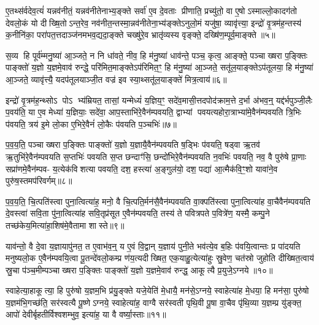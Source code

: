 ए॒तथ्स॑र्वदेव॒त्यं॑ यन्नव॑नीतं॒ यन्नव॑नीतेनाभ्य॒ङ्क्ते सर्वा॑ ए॒व दे॒वताः प्रीणाति॒ प्रच्यु॑तो॒ वा ए॒षोऽस्माल्लो॒कादग॑तो देवलो॒कं यो दीख्षि॒तोऽन्त॒रेव॒ नव॑नीत॒न्तस्मा॒न्नव॑नीतेना॒भ्य॑ङ्क्तेऽनुलो॒मं यजु॑षा॒ व्यावृ॑त्त्या॒ इन्द्रो॑ वृ॒त्रम॑ह॒न्तस्य॑ क॒नीनि॑का॒ परा॑पत॒त्तदाञ्ज॑नमभव॒द्यदा॒ङ्क्ते चख्षु॑रे॒व भ्रातृ॑व्यस्य वृङ्क्ते॒ दख्षि॑ण॒म्पूर्व॒माङ्क्ते॥५॥

स॒व्य हि पूर्व॑म्मनु॒ष्या॑ आ॒ञ्जते॒ न नि धा॑वते॒ नीव॒ हि म॑नु॒ष्या॑ धाव॑न्ते॒ पञ्च॒ कृत्व॒ आङ्क्ते॒ पञ्चाख्षरा प॒ङ्क्तिः पाङ्क्तो॑ य॒ज्ञो य॒ज्ञमे॒वाव॑ रुन्द्धे॒ परि॑मित॒माङ्क्तेऽप॑रिमित॒ꣳ॒ हि म॑नु॒ष्या॑ आ॒ञ्जते॒ सतू॑ल॒याङ्क्तेऽप॑तूलया॒ हि म॑नु॒ष्या॑ आ॒ञ्जते॒ व्यावृ॑त्त्यै॒ यदप॑तूलयाञ्जी॒त वज्र॑ इव स्या॒थ्सतू॑ल॒याङ्क्ते॑ मित्र॒त्वाय॑॥६॥

इन्द्रो॑ वृ॒त्रम॑ह॒न्थ्सोऽ पोऽ भ्य॑म्रियत॒ तासां॒ यन्मेध्यं॑ य॒ज्ञिय॒ꣳ॒ सदे॑व॒मासी॒त्तदपोद॑क्राम॒त्ते द॒र्भा अ॑भव॒न्॒ यद्द॑र्भपुञ्जी॒लैः प॒वय॑ति॒ या ए॒व मेध्या॑ य॒ज्ञियाः॒ सदे॑वा॒ आप॒स्ताभि॑रे॒वैन॑म्पवयति॒ द्वाभ्यां पवयत्यहोरा॒त्राभ्या॑मे॒वैन॑म्पवयति त्रि॒भिः प॑वयति॒ त्रय॑ इ॒मे लो॒का ए॒भिरे॒वैनं॑ लो॒कैः प॑वयति प॒ञ्चभिः॑॥७॥

प॒व॒य॒ति॒ पञ्चाख्षरा प॒ङ्क्तिः पाङ्क्तो॑ य॒ज्ञो य॒ज्ञायै॒वैन॑म्पवयति ष॒ड्भिः प॑वयति॒ षड्वा ऋ॒तव॑ ऋ॒तुभि॑रे॒वैन॑म्पवयति स॒प्तभिः॑ पवयति स॒प्त छन्दाꣳ॑सि॒ छन्दो॑भिरे॒वैन॑म्पवयति न॒वभिः॑ पवयति॒ नव॒ वै पुरु॑षे प्रा॒णाः सप्रा॑णमे॒वैन॑म्पव- य॒त्येक॑विशत्या पवयति॒ दश॒ हस्त्या॑ अ॒ङ्गुल॑यो॒ दश॒ पद्या॑ आ॒त्मैक॑वि॒ꣳ॒शो यावा॑ने॒व पुरु॑ष॒स्तमप॑रिवर्गम्॥८॥

प॒व॒य॒ति॒ चि॒त्पति॑स्त्वा पुना॒त्वित्या॑ह॒ मनो॒ वै चि॒त्पति॒र्मन॑सै॒वैन॑म्पवयति वा॒क्पति॑स्त्वा पुना॒त्वित्या॑ह वा॒चैवैन॑म्पवयति दे॒वस्त्वा॑ सवि॒ता पु॑ना॒त्वित्या॑ह सवि॒तृप्र॑सूत ए॒वैन॑म्पवयति॒ तस्य॑ ते पवित्रपते प॒वित्रे॑ण॒ यस्मै॒ कम्पु॒ने तच्छ॑केय॒मित्या॑हा॒शिष॑मे॒वैतामा शास्ते॥९॥

{\anuvakamend[{अ॒ती॒का॒शान्क॑रो॒त्यवे॑शयन्ती॒र्थे स्ना॑ति प्रघा॒तो म॑नु॒ष्या॑णा॒न्तद्वा आङ्क्ते॑ मित्र॒त्वाय॑ प॒ञ्चभि॒रप॑रिवर्गम॒ष्टाच॑त्वारिशच्च॥१॥}]}

याव॑न्तो॒ वै दे॒वा य॒ज्ञायापु॑नत॒ त ए॒वाभ॑व॒न्॒ य ए॒वं वि॒द्वान् य॒ज्ञाय॑ पुनी॒ते भव॑त्ये॒व ब॒हिः प॑वयि॒त्वान्तः प्र पा॑दयति मनुष्यलो॒क ए॒वैन॑म्पवयि॒त्वा पू॒तन्दे॑वलो॒कम्प्र ण॑य॒त्यदीख्षित॒ एक॒याहु॒त्येत्या॑हुः स्रु॒वेण॒ चत॑स्रो जुहोति दीख्षित॒त्वाय॑ स्रु॒चा प॑ञ्च॒मीम्पञ्चाख्षरा प॒ङ्क्तिः पाङ्क्तो॑ य॒ज्ञो य॒ज्ञमे॒वाव॑ रुन्द्ध॒ आकूत्यै प्र॒युजे॒ऽग्नये॥१०॥

स्वाहेत्या॒हाकूत्या॒ हि पुरु॑षो य॒ज्ञम॒भि प्र॑यु॒ङ्क्ते यजे॒येति॑ मे॒धायै॒ मन॑से॒ऽग्नये॒ स्वाहेत्या॑ह मे॒धया॒ हि मन॑सा॒ पुरु॑षो य॒ज्ञम॑भि॒गच्छ॑ति॒ सर॑स्वत्यै पू॒ष्णेऽग्नये॒ स्वाहेत्या॑ह॒ वाग्वै सर॑स्वती पृथि॒वी पू॒षा वा॒चैव पृ॑थि॒व्या य॒ज्ञम्प्र यु॑ङ्क्त॒ आपो॑ देवीर्बृहतीर्विश्वशम्भुव॒ इत्या॑ह॒ या वै वर्ष्या॒स्ताः॥११॥

